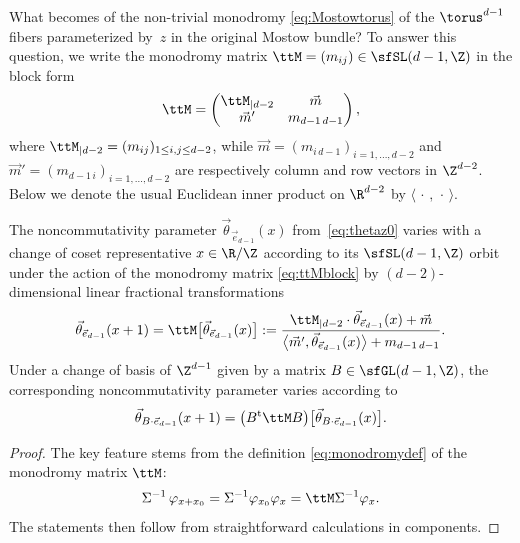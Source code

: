 What becomes of the non-trivial monodromy \eqref{eq:Mostowtorus} of
the $\torus^{d-1}$ fibers parameterized by~$z$ in the original Mostow
bundle? To answer this question, we write the monodromy matrix
$\ttM=(m_{ij})\in\sfSL(d-1,\Z)$ in the block form
\begin{gather}\label{eq:ttMblock}
\ttM = \left(\begin{matrix} \ttM_{|d-2} & \vec m \\
\vec m' & m_{d-1 \, d-1}
\end{matrix}\right) ,
\end{gather}
where $\ttM_{|d-2}=(m_{ij})_{1\leq i,j\leq d-2}$, while $\vec m=(m_{i \,
 d-1})_{i=1,\dots,d-2}$ and $\vec m' = (m_{d-1 \,
 i})_{i=1,\dots,d-2}$ are respectively column and row vectors in $\Z^{d-2}$. Below
we denote the usual Euclidean inner product on $\R^{d-2}$ by
$\langle\,\cdot\,,\,\cdot\,\rangle$.
\begin{Proposition}\label{prop:monodromyprop}
The noncommutativity parameter
$\vec\theta_{\vec e_{d-1}}(x)$ from~\eqref{eq:thetaz0} varies with a
change of coset representative $x\in\R/\Z$ according to its
$\sfSL(d-1,\Z)$ orbit under the action of the monodromy matrix
\eqref{eq:ttMblock} by $(d{-}2)$-dimensional linear fractional transformations
\begin{gather}\label{eq:thetaMoritagen}
\vec\theta_{\vec e_{d-1}}(x+1) = \ttM\big[\vec\theta_{\vec
 e_{d-1}}(x)\big] :=
\frac{\ttM_{|d-2}\cdot\vec\theta_{\vec e_{d-1}}(x) + \vec m}
{\big\langle \vec m',\vec\theta_{\vec e_{d-1}}(x)\big\rangle + m_{d-1 \,
 d-1}} .
\end{gather}
Under a change of basis of $\Z^{d-1}$ given
by a matrix $B\in\sfGL(d-1,\Z)$, the corresponding noncommutativity
parameter varies according to
\[
\vec\theta_{B\cdot\vec e_{d-1}}(x+1) = \big(B^{\rm
 t} \ttM B\big)\big[\vec\theta_{B\cdot\vec e_{d-1}}(x)\big] .
\]
\end{Proposition}
\begin{proof}
The key feature stems from the definition \eqref{eq:monodromydef} of the monodromy matrix
$\ttM$:
\[
\Sigma^{-1}\,\varphi_{x+x_0} = \Sigma^{-1} \varphi_{x_0} \varphi_x =
\ttM \Sigma^{-1} \varphi_x .
\]
The statements then follow from straightforward calculations in components.
\end{proof}

